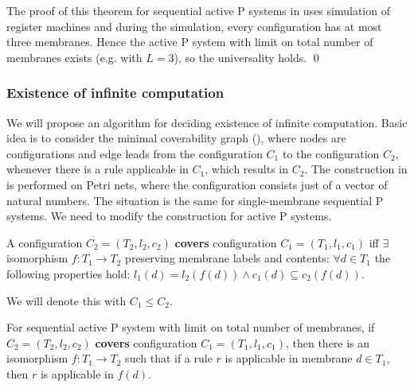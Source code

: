 \begin{dokaz}
  The proof of this theorem for sequential active P systems in \cite{Ibarra05Active} uses simulation of register machines and during the simulation, every configuration has at most three membranes. Hence the active P system with limit on total number of membranes exists (e.g. with $L=3$), so the universality holds.
  \qed
\end{dokaz}

\subsubsection{Existence of infinite computation} %
\label{ssub:existence_of_infinite_computation}

We will propose an algorithm for deciding existence of infinite computation. Basic idea is to consider the minimal coverability graph (\cite{Rozenberg93MinimalCoverabilityGraph}), where nodes are configurations and edge leads from the configuration $C_1$ to the configuration $C_2$, whenever there is a rule applicable in $C_1$, which results in $C_2$. The construction in \cite{Rozenberg93MinimalCoverabilityGraph} is performed on Petri nets, where the configuration consists just of a vector of natural numbers. The situation is the same for single-membrane sequential P systems. We need to modify the construction for active P systems.

A configuration $C_2 = (T_2, l_2, c_2)$ {\bf covers} configuration $C_1 = (T_1, l_1, c_1)$ iff $\exists$ isomorphism $f: T_1\rightarrow T_2$ preserving membrane labels and contents: $\forall d\in T_1$ the following properties hold: $l_1(d)=l_2(f(d))\wedge c_1(d)\subseteq c_2(f(d))$.

We will denote this with $C_1\leq C_2$.

\begin{lemma}
\label{rule_applicability_lemma}
  For sequential active P system with limit on total number of membranes, if $C_2 = (T_2, l_2, c_2)$ {\bf covers} configuration $C_1 = (T_1, l_1, c_1)$, then there is an isomorphism $f: T_1\rightarrow T_2$ such that if a rule $r$ is applicable in membrane $d\in T_1$, then $r$ is applicable in $f(d)$.
\end{lemma}

